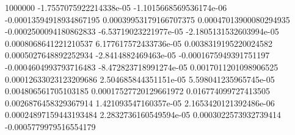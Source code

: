 {1000000 -1.7557075922214338e-05 -1.1015668569536174e-06 -0.00013594918934867195 0.00039953179166707375 0.00047013900080294935 -0.0002500094180862833 -6.53719023221977e-05 -2.1805131532603994e-05 0.0008068641221210537 6.177617572433736e-05 0.0038319195220024582 0.0005027648892252934 -2.8414882469463e-05 -0.0001675949391751197 -0.0004604993793716483 -8.472823718991274e-05 0.0017011201098906525 0.00012633023123209686 2.504685844351151e-05 5.598041235965745e-05 0.004806561705103185 0.00017527720129661972 0.016774099727413505 0.0026876458329367914 1.421093547160357e-05 2.1653420121392486e-06 0.00024897159443193484 2.2832736160549594e-05 0.0003022573932739414 -0.0005779979516554179
}\dataA

